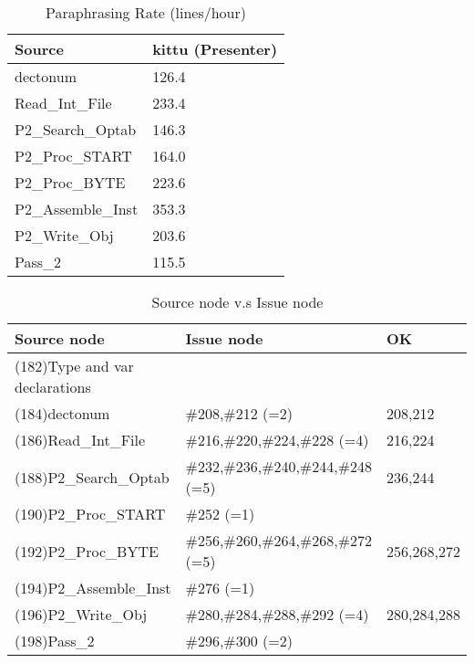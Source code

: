 \begin{table}[hb]
\begin{center}
\begin{tabular}{|l|l|}
\hline
Source & kittu (Presenter)\\
\hline
dectonum & 126.4\\
Read\_Int\_File & 233.4\\
P2\_Search\_Optab & 146.3\\
P2\_Proc\_START & 164.0\\
P2\_Proc\_BYTE & 223.6\\
P2\_Assemble\_Inst & 353.3\\
P2\_Write\_Obj & 203.6\\
Pass\_2 & 115.5\\
\hline
\end{tabular}
\end{center}
\caption{Paraphrasing Rate (lines/hour)}
\end{table}


\begin{table}[hb]
\begin{center}
\begin{tabular}{|l|l|l|}
\hline
Source node & Issue node  & OK\\
\hline
(182)Type and var declarations &  & \\
(184)dectonum & \#208,\#212 (=2) & 208,212\\
(186)Read\_Int\_File & \#216,\#220,\#224,\#228 (=4) & 216,224\\
(188)P2\_Search\_Optab & \#232,\#236,\#240,\#244,\#248 (=5) & 236,244 \\
(190)P2\_Proc\_START & \#252 (=1) & \\
(192)P2\_Proc\_BYTE & \#256,\#260,\#264,\#268,\#272 (=5) & 256,268,272\\
(194)P2\_Assemble\_Inst & \#276 (=1) & \\
(196)P2\_Write\_Obj & \#280,\#284,\#288,\#292 (=4) & 280,284,288\\
(198)Pass\_2 & \#296,\#300 (=2) & \\
\hline
\end{tabular}
\caption{Source node v.s Issue node}
\end{center}
\end{table}

